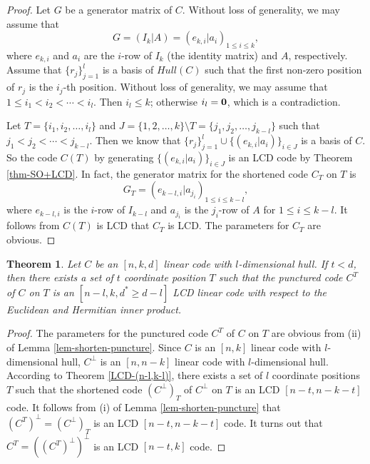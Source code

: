 \documentclass[12pt,twoside]{article}
\theoremstyle{plain}
\newtheorem{theorem}{Theorem}[section]
\theoremstyle{definition}
\theoremstyle{remark}
\begin{document}
\begin{proof}
Let $G$ be a generator matrix of $C$. Without loss of generality, we may assume that $$G=(I_k|A)=(e_{k,i}|a_i)_{1\leq i\leq k},$$
where $e_{k,i}$ and $a_i$ are the $i$-row of $I_k$ (the identity matrix) and $A$, respectively.
Assume that $\{r_j\}_{j=1}^l$ is a basis of $Hull(C)$ such that the first non-zero position of $r_j$ is the $i_j$-th position. Without loss of generality, we may assume that
$1\leq i_1< i_2< \cdots < i_l$. Then $i_l\leq k$; otherwise $i_l=\textbf 0$, which is a contradiction.

Let $T=\{i_1,i_2,\ldots,i_l\}$ and $J=\{1,2,\ldots,k\}\setminus T=\{j_1,j_2,\ldots,j_{k-l}\}$ such that $j_1<j_2<\cdots<j_{k-l}$.
Then we know that $\{r_j\}_{j=1}^l \cup \{(e_{k,i}|a_i)\}_{i\in J}$ is a basis of $C$.
So the code $C(T)$ by generating
$\{(e_{k,i}|a_i)\}_{i\in J}$ is an LCD code by Theorem \ref{thm-SO+LCD}.
In fact, the generator matrix for the shortened code $C_T$ on $T$ is
$$G_T=(e_{k-l,i}|a_{j_i})_{1\leq i\leq k-l},$$
 where $e_{k-l,i}$ is the $i$-row of $I_{k-l}$ and $a_{j_i}$ is the ${j_i}$-row of $A$ for $1\leq i\leq k-l$.
It follows from $C(T)$ is LCD that $C_T$ is LCD. The parameters for $C_T$ are obvious.
\end{proof}



\begin{theorem}\label{puncture}
Let $C$ be an $[n,k,d]$ linear code with $l$-dimensional hull. If $t<d$, then there exists a set of $t$ coordinate position $T$ such that the punctured code $C^T$ of $C$ on $T$ is an $[n-l,k,d^*\geq d-l]$ LCD linear code with respect to the Euclidean and Hermitian inner product.
\end{theorem}

\begin{proof}
The parameters for the punctured code $C^T$ of $C$ on $T$ are obvious from (ii) of Lemma \ref{lem-shorten-puncture}.
Since $C$ is an $[n,k]$ linear code with $l$-dimensional hull, $C^{\perp}$ is an $[n,n-k]$ linear code with $l$-dimensional hull.
According to Theorem \ref{LCD-(n-l,k-l)}, there exists a set of $l$ coordinate positions $T$ such that the shortened code $(C^\perp)_T$ of $C^\perp$ on $T$ is an LCD $[n-t,n-k-t]$ code.
It follows from (i) of Lemma \ref{lem-shorten-puncture} that $(C^T)^\perp=(C^\perp)_T$ is an LCD $[n-t,n-k-t]$ code.
It turns out that $C^T=((C^T)^\perp)^\perp$ is an LCD $[n-t,k]$ code.
\end{proof}
\end{document}
